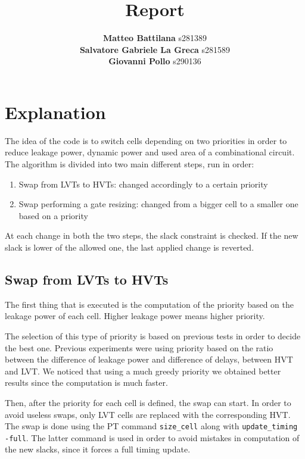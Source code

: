 \documentclass{article}
\title{\Huge Report}
\author{
	\large \textbf{Matteo Battilana} s281389 \\
	\large \textbf{Salvatore Gabriele La Greca} s281589 \\
	\large \textbf{Giovanni Pollo} s290136}
\date{}
\begin{document}
	\begin{titlepage}
		\centering
		\vspace{2px}
	\end{titlepage}
	\maketitle
	\thispagestyle{empty}
	
	\newpage
	
	\thispagestyle{empty}
	
	\section{Explanation}
	
	The idea of the code is to switch cells depending on two priorities in order to reduce leakage power, dynamic power and used area of a combinational circuit. The algorithm is divided into two main different steps, run in order:
	
	\begin{enumerate}
		\itemsep0sp
		\item Swap from LVTs to HVTs: changed accordingly to a certain priority 
		\item Swap performing a gate resizing: changed from a bigger cell to a smaller one based on a priority
	\end{enumerate}
	
	At each change in both the two steps, the slack constraint is checked. If the new slack is lower of the allowed one, the last applied change is reverted.


	\subsection{Swap from LVTs to HVTs}
	
	The first thing that is executed is the computation of the priority based on the leakage power of each cell. Higher leakage power means higher priority.

	The selection of this type of priority is based on previous tests in order to decide the best one. Previous experiments were using priority based on the ratio between the difference of leakage power and difference of delays, between HVT and LVT. We noticed that using a much greedy priority we obtained better results since the computation is much faster.   

	Then, after the priority for each cell is defined, the swap can start. In order to avoid useless swaps, only LVT cells are replaced with the corresponding HVT. The swap is done using the PT command \texttt{size\_cell} along with \texttt{update\_timing -full}. The latter command is used in order to avoid mistakes in computation of the new slacks, since it forces a full timing update. 
	
\end{document}
